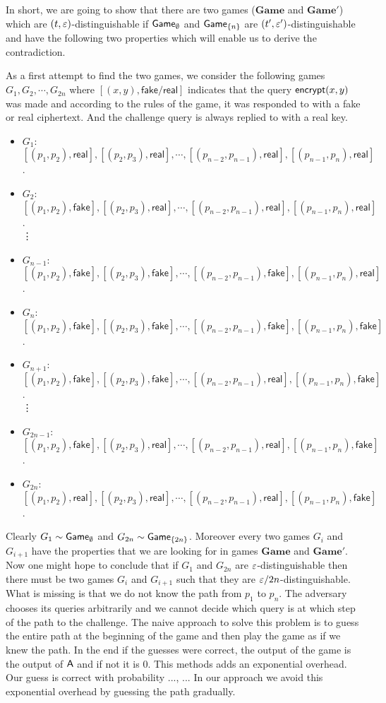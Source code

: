 \documentclass{article}
\def\A{{\sf A}}
\newcommand{\encrypt}{{\sf encrypt}}
\newcommand{\game}{{\sf Game}}
\newcommand{\dgame}{{\mathbf{Game}}}
\newcommand{\real}{{\mathsf {real}}}
\newcommand{\fake}{{\mathsf {fake}}}
\newcommand{\qF}[2]{\left[ (p_{#1},p_{#2}), \fake\right]}
\newcommand{\qR}[2]{\left[ (p_{#1},p_{#2}), \real\right]}
\begin{document}
  In short, we are going to show that there are two games ($\dgame$ and $\dgame'$) which are $(t,\varepsilon)$-distinguishable if $\game_{\emptyset}$ and $\game_{\cub{n}}$ are $(t',\varepsilon')$-distinguishable and have the following two properties which will enable us to derive the contradiction.
\iffalse
\begin{enumerate}[Property 1.]
 \item $\dgame$ and $\dgame'$ are identical except for the response to one query $\encrypt(y,z)$, which is replied to with a real ciphertext in $\dgame$ and a face one in $\dgame'$.
 \item If a query $\encrypt(x,y)$ is made during the game, a fake response is returned, in both game.
 \end{enumerate}\fi
 
 As a first attempt to find the two games, we consider the following games $G_1, G_2, \cdots, G_{2n}$ where $[(x,y), {\mathsf{fake/real}}]$ indicates that the query $\encrypt(x,y)$ was made and according to the rules of the game, it was responded to with a fake or real ciphertext. And the challenge query is always replied to with a real key. 
 
 \begin{itemize}
\item $G_1$:$\qR{1}{2},\qR{2}{3}, \cdots,\qR{n-2}{n-1},\qR{n-1}{n}$.
\item $G_2$:$\qF{1}{2},\qR{2}{3}, \cdots,\qR{n-2}{n-1},\qR{n-1}{n}$.\\
 \vdots
\item $G_{n-1}$:$\qF{1}{2},\qF{2}{3}, \cdots,\qF{n-2}{n-1},\qR{n-1}{n}$.
\item $G_{n}$:$\qF{1}{2},\qF{2}{3}, \cdots,\qF{n-2}{n-1},\qF{n-1}{n}$.
\item $G_{n+1}$:$\qF{1}{2},\qF{2}{3}, \cdots,\qR{n-2}{n-1},\qF{n-1}{n}$.\\
 \vdots
\item $G_{2n-1}$:$\qF{1}{2},\qR{2}{3}, \cdots,\qR{n-2}{n-1},\qF{n-1}{n}$.
\item $G_{2n}$:$\qR{1}{2},\qR{2}{3}, \cdots,\qR{n-2}{n-1},\qF{n-1}{n}$.
 \end{itemize}

\noindent Clearly $G_1 \sim \game_{\emptyset}$ and $G_{2n}\sim\game_{\cub{2n}}$. Moreover every two games $G_i$ and $G_{i+1}$ have the properties that we are looking for in games $\dgame$ and $\dgame'$. Now one might hope to conclude that if $G_1$ and $G_{2n}$ are $\varepsilon$-distinguishable then there must be two games $G_i$ and $G_{i+1}$ such that they are $\varepsilon/2n$-distinguishable. What is missing is that we do not know the path from $p_1$ to $p_n$. The adversary chooses its queries arbitrarily and we cannot decide which query is at which step of the path to the challenge. The naive approach to solve this problem is to guess the entire path at the beginning of the game and then play the game as if we knew the path. In the end if the guesses were correct, the output of the game is the output of $\A$ and if not it is 0. This methods adds an exponential overhead. Our guess is correct with probability ..., ... In our approach we avoid this exponential overhead by guessing the path gradually.\\
\end{document}
